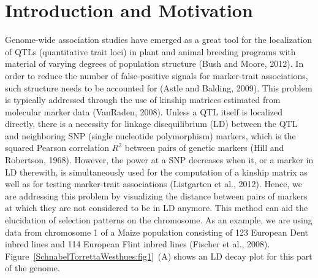 \documentclass[twoside]{report}
\begin{document}
\section{Introduction and Motivation}

Genome-wide association studies have emerged as a great tool for the 
localization of QTLs (quantitative trait loci) in plant and animal breeding programs 
with material of varying degrees of population structure (Bush and Moore, 2012). 
In order to reduce the number of false-positive signals for marker-trait associations,
such structure needs to be accounted for (Astle and Balding, 2009). This problem is 
typically addressed through 
the use of kinship matrices estimated from molecular marker data (VanRaden, 2008).
Unless a QTL itself is localized directly, there is a necessity for linkage disequilibrium (LD) between
the QTL and neighboring SNP (single nucleotide polymorphism) markers, 
which is the squared Pearson correlation $R^2$ between pairs of genetic
markers (Hill and Robertson, 1968). However, the power at a SNP 
 decreases when it, or a marker in LD therewith,
is simultaneously used for the computation of a kinship matrix as well as for testing marker-trait 
associations (Listgarten et al., 2012). 
Hence, we are addressing this problem by visualizing the distance
between pairs of markers at which they are not considered to be in LD anymore. 
This method can aid 
the elucidation
of selection patterns on the chromosome. As an example, we are using data from chromosome 1 of a Maize 
population consisting of 123 European Dent inbred lines and 114 European Flint inbred lines
(Fischer et al., 2008). Figure~\ref{SchnabelTorrettaWesthues:fig1}~(A) shows an LD decay plot 
for this part of the genome. 
\end{document}
